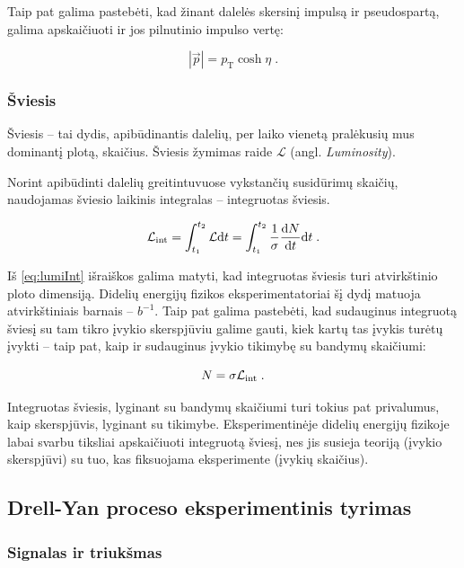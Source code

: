 \documentclass[a4paper, 12pt]{article}
\newcommand{\Lumi}{{\cal L}_\mathrm{int}}
\newlength\q
\begin{document}
Taip pat galima pastebėti, kad žinant dalelės skersinį impulsą ir pseudospartą, galima apskaičiuoti ir
jos pilnutinio impulso vertę:

\begin{equation}
	|\vec p|=p_{\mathrm{T}}\cosh\eta \; .
	\label{eq:pmodpt}
\end{equation}


\subsubsection*{Šviesis}

Šviesis -- tai dydis, apibūdinantis dalelių, per laiko vienetą pralėkusių mus
dominantį plotą, skaičius. Šviesis žymimas raide $\mathcal{L}$ (angl. \textit{Luminosity}).

Norint apibūdinti dalelių greitintuvuose vykstančių susidūrimų skaičių, naudojamas šviesio
laikinis integralas -- integruotas šviesis.

\begin{equation}
	\Lumi=\int_{t_1}^{t_2} \mathcal{L}\mathrm{d}t =
	\int_{t_1}^{t_2} \frac{1}{\sigma}\frac{\mathrm{d}N}{\mathrm{d}t} \mathrm{d}t \; .
\label{eq:lumiInt}
\end{equation}

Iš \eqref{eq:lumiInt} išraiškos galima matyti, kad integruotas šviesis turi atvirkštinio ploto
dimensiją.
Didelių energijų fizikos eksperimentatoriai šį dydį matuoja atvirkštiniais barnais -- $b^{-1}$.
Taip pat galima pastebėti, kad sudauginus integruotą šviesį su tam tikro įvykio skerspjūviu
galime gauti, kiek kartų tas įvykis turėtų įvykti -- taip pat, kaip ir sudauginus įvykio tikimybę
su bandymų skaičiumi:

\begin{equation}
	N=\sigma\Lumi \; .
\label{eq:evno}
\end{equation}

Integruotas šviesis, lyginant su bandymų skaičiumi turi tokius pat privalumus, kaip skerspjūvis,
lyginant su tikimybe.
Eksperimentinėje didelių energijų fizikoje labai svarbu tiksliai apskaičiuoti integruotą šviesį,
nes jis susieja teoriją (įvykio skerspjūvi) su tuo, kas fiksuojama eksperimente (įvykių skaičius).


\subsection{Drell-Yan proceso eksperimentinis tyrimas}

\subsubsection{Signalas ir triukšmas}\label{sec:SignalBkg}
\end{document}
